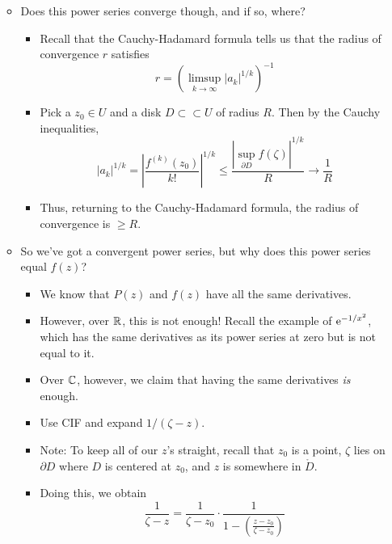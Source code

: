 \documentclass[../notes.tex]{subfiles}
\begin{document}
\begin{itemize}
\begin{itemize}
\begin{itemize}
\begin{equation*}
            \end{equation*}
        \end{itemize}
        \item Does this power series converge though, and if so, where?
        \begin{itemize}
            \item Recall that the Cauchy-Hadamard formula tells us that the radius of convergence $r$ satisfies
            \begin{equation*}
                r = \left( \limsup_{k\to\infty}|a_k|^{1/k} \right)^{-1}
            \end{equation*}
            \item Pick a $z_0\in U$ and a disk $D\subset\subset U$ of radius $R$. Then by the Cauchy inequalities,
            \begin{equation*}
                |a_k|^{1/k} = \left| \frac{f^{(k)}(z_0)}{k!} \right|^{1/k}
                \leq \frac{|\sup_{\partial D}f(\zeta)|^{1/k}}{R}
                \to \frac{1}{R}
            \end{equation*}
            \item Thus, returning to the Cauchy-Hadamard formula, the radius of convergence is $\geq R$.
        \end{itemize}
        \item So we've got a convergent power series, but why does this power series equal $f(z)$?
        \begin{itemize}
            \item We know that $P(z)$ and $f(z)$ have all the same derivatives.
            \item However, over $\R$, this is not enough! Recall the example of $\e[-1/x^2]$, which has the same derivatives as its power series at zero but is not equal to it.
            \item Over $\C$, however, we claim that having the same derivatives \emph{is} enough.
            \item Use CIF and expand $1/(\zeta-z)$.
            \item Note: To keep all of our $z$'s straight, recall that $z_0$ is a point, $\zeta$ lies on $\partial D$ where $D$ is centered at $z_0$, and $z$ is somewhere in $\mathring{D}$.
            \item Doing this, we obtain
            \begin{equation*}
                \frac{1}{\zeta-z} = \frac{1}{\zeta-z_0}\cdot\frac{1}{1-\left( \frac{z-z_0}{\zeta-z_0} \right)}

\end{equation*}
\end{itemize}
\end{itemize}
\end{itemize}
\end{document}
